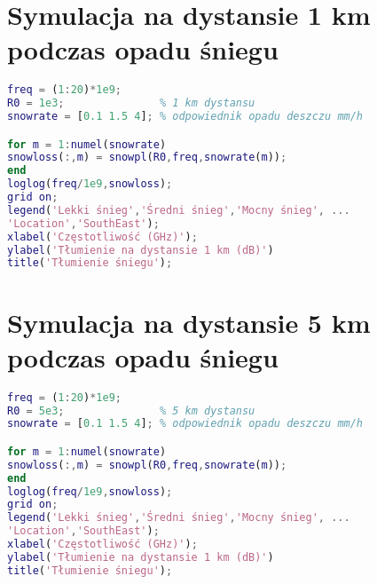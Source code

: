 \section{Symulacja na dystansie 1 km podczas opadu śniegu}
\begin{lstlisting}[language=matlab, xleftmargin=0pt, backgroundcolor={\color{white}}, caption={}, frame=""]
freq = (1:20)*1e9;
R0 = 1e3;               % 1 km dystansu
snowrate = [0.1 1.5 4]; % odpowiednik opadu deszczu mm/h

for m = 1:numel(snowrate)
snowloss(:,m) = snowpl(R0,freq,snowrate(m));
end
loglog(freq/1e9,snowloss);
grid on;
legend('Lekki śnieg','Średni śnieg','Mocny śnieg', ...
'Location','SouthEast');
xlabel('Częstotliwość (GHz)');
ylabel('Tłumienie na dystansie 1 km (dB)')
title('Tłumienie śniegu');
\end{lstlisting}

\section{Symulacja na dystansie 5 km podczas opadu śniegu}
\begin{lstlisting}[language=matlab, xleftmargin=0pt, backgroundcolor={\color{white}}, caption={}, frame=""]
freq = (1:20)*1e9;
R0 = 5e3;               % 5 km dystansu
snowrate = [0.1 1.5 4]; % odpowiednik opadu deszczu mm/h

for m = 1:numel(snowrate)
snowloss(:,m) = snowpl(R0,freq,snowrate(m));
end
loglog(freq/1e9,snowloss);
grid on;
legend('Lekki śnieg','Średni śnieg','Mocny śnieg', ...
'Location','SouthEast');
xlabel('Częstotliwość (GHz)');
ylabel('Tłumienie na dystansie 1 km (dB)')
title('Tłumienie śniegu');
\end{lstlisting}
